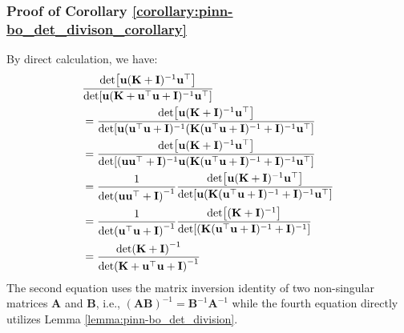 \subsubsection{Proof of Corollary \ref{corollary:pinn-bo_det_divison_corollary}}
By direct calculation, we have:
\begin{align*}
    & \frac{\det[\mathbf{u}(\mathbf{K}+\mathbf{I})^{-1} \mathbf{u}^\top]}{\det [\mathbf{u}(\mathbf{K}+ \mathbf{u}^\top \mathbf{u} + \mathbf{I})^{-1} \mathbf{u}^\top]} \notag
\\
    &= \frac{\det[\mathbf{u}(\mathbf{K}+\mathbf{I})^{-1} \mathbf{u}^\top]}{\det [\mathbf{u} (\mathbf{u}^\top \mathbf{u}+\mathbf{I})^{-1}(\mathbf{K} (\mathbf{u}^\top \mathbf{u} + \mathbf{I})^{-1} + \mathbf{I})^{-1} \mathbf{u}^\top]}
\\
    &=\frac{\det[\mathbf{u}(\mathbf{K}+\mathbf{I})^{-1} \mathbf{u}^\top]}{\det [ (\mathbf{u} \mathbf{u}^\top+\mathbf{I})^{-1}\mathbf{u} (\mathbf{K} (\mathbf{u}^\top \mathbf{u} + \mathbf{I})^{-1} + \mathbf{I})^{-1} \mathbf{u}^\top]}
\\
    &= \frac{1}{\det (\mathbf{u} \mathbf{u}^\top+\mathbf{I})^{-1}} \frac{\det[\mathbf{u}(\mathbf{K}+\mathbf{I})^{-1} \mathbf{u}^\top]}{\det [\mathbf{u} (\mathbf{K} (\mathbf{u}^\top \mathbf{u} + \mathbf{I})^{-1} + \mathbf{I})^{-1} \mathbf{u}^\top]}
\\
    &=\frac{1}{\det (\mathbf{u} ^\top \mathbf{u}+\mathbf{I})^{-1}} \frac{\det[(\mathbf{K}+\mathbf{I})^{-1}]}{\det [ (\mathbf{K} (\mathbf{u}^\top \mathbf{u} + \mathbf{I})^{-1} + \mathbf{I})^{-1}]}
\\
    &= \frac{\det (\mathbf{K}+\mathbf{I})^{-1}}{\det(\mathbf{K}+\mathbf{u}^\top \mathbf{u}+\mathbf{I})^{-1}}
\end{align*}
The second equation uses the matrix inversion identity of two non-singular matrices $\mathbf{A}$ and $\mathbf{B}$, i.e., $(\mathbf{A}\mathbf{B})^{-1} = \mathbf{B}^{-1} \mathbf{A}^{-1}$ while the fourth equation directly utilizes Lemma \ref{lemma:pinn-bo_det_division}.
